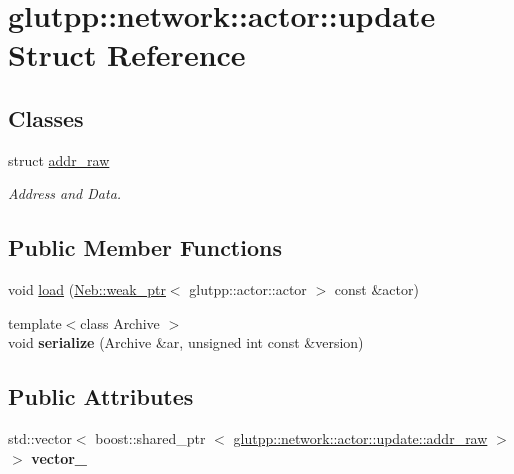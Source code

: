 \hypertarget{structglutpp_1_1network_1_1actor_1_1update}{\section{glutpp\-:\-:network\-:\-:actor\-:\-:update \-Struct \-Reference}
\label{structglutpp_1_1network_1_1actor_1_1update}
}
\subsection*{\-Classes}
\begin{DoxyCompactItemize}
\item 
struct \hyperlink{structglutpp_1_1network_1_1actor_1_1update_1_1addr__raw}{addr\-\_\-raw}
\begin{DoxyCompactList}\small\item\em \-Address and \-Data. \end{DoxyCompactList}\end{DoxyCompactItemize}
\subsection*{\-Public \-Member \-Functions}
\begin{DoxyCompactItemize}
\item 
void \hyperlink{structglutpp_1_1network_1_1actor_1_1update_a2a7bee8209aa582266f5bb4e6e729501}{load} (\hyperlink{classNeb_1_1weak__ptr}{\-Neb\-::weak\-\_\-ptr}$<$ glutpp\-::actor\-::actor $>$ const \&actor)
\item 
\hypertarget{structglutpp_1_1network_1_1actor_1_1update_ac937da16db2ce2dd15988cbd00841286}{{\footnotesize template$<$class Archive $>$ }\\void {\bfseries serialize} (\-Archive \&ar, unsigned int const \&version)}\label{structglutpp_1_1network_1_1actor_1_1update_ac937da16db2ce2dd15988cbd00841286}

\end{DoxyCompactItemize}
\subsection*{\-Public \-Attributes}
\begin{DoxyCompactItemize}
\item 
\hypertarget{structglutpp_1_1network_1_1actor_1_1update_a178e81960ce2ad6fe2cf7b0668afd835}{std\-::vector$<$ boost\-::shared\-\_\-ptr\*
$<$ \hyperlink{structglutpp_1_1network_1_1actor_1_1update_1_1addr__raw}{glutpp\-::network\-::actor\-::update\-::addr\-\_\-raw} $>$ $>$ {\bfseries vector\-\_\-}}\label{structglutpp_1_1network_1_1actor_1_1update_a178e81960ce2ad6fe2cf7b0668afd835}

\end{DoxyCompactItemize}


